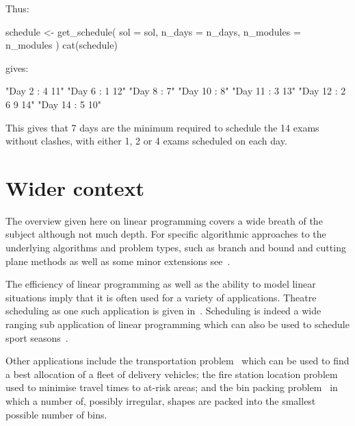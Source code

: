 Thus:

\begin{Rin-no-test}
schedule <- get_schedule(
  sol = sol,
  n_days = n_days,
  n_modules = n_modules
)
cat(schedule)
\end{Rin-no-test}

gives:

\begin{Rout-no-test}

 "Day 2 : 4 11"
 "Day 6 : 1 12"
 "Day 8 : 7"
 "Day 10 : 8"
 "Day 11 : 3 13"
 "Day 12 : 2 6 9 14"
 "Day 14 : 5 10"
\end{Rout-no-test}

This gives that 7 days are the minimum required to schedule the 14 exams without
clashes, with either 1, 2 or 4 exams scheduled on each day.

\section{Wider context}\label{sec:linear_programming_wider_context}

The overview given here on linear programming covers a wide breath of the subject
although not much depth. For specific algorithmic approaches to the underlying
algorithms and problem types, such as branch and bound and cutting plane methods
as well as some minor extensions see~\cite{conforti2014integer,
sultan2014linear}.

The efficiency of linear programming as well as the ability to model
linear situations imply that it is often used for a variety of applications.
Theatre scheduling as one such application is given
in~\cite{guerriero2011operational}.
Scheduling is indeed a wide ranging sub application of linear programming
which can also be used to schedule sport
seasons~\cite{duran2007scheduling}.

Other applications include the transportation problem~\cite{diaz2014survey}
which can be used to find a best allocation of a fleet of delivery vehicles;
the fire station location problem~\cite{schreuder1981application} used to
minimise travel times to at-risk areas; and the bin packing
problem~\cite{hifi2010linear} in which a number of, possibly irregular,
shapes are packed into the smallest possible number of bins.
